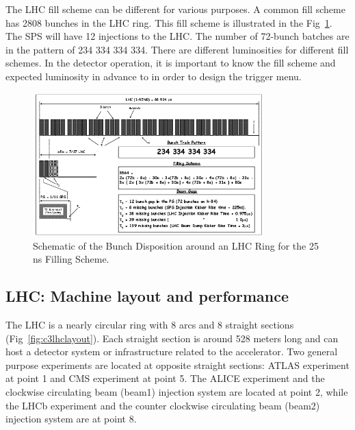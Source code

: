 The LHC fill scheme can be different for various purposes. A common fill scheme has 2808 bunches in the LHC ring. This fill scheme is illustrated in the Fig~\ref{fig:c3lhcfillscheme}. The SPS will have 12 injections to the LHC. The number of 72-bunch batches are in the pattern of 234 334 334 334. There are different luminosities for different fill schemes. In the detector operation, it is important to know the fill scheme and expected luminosity in advance to in order to design the trigger menu. 

\begin{figure}[htbp]
 \begin{center}
  \includegraphics[width=0.8\textwidth]{figures/c3/c3_lhc_fillscheme.png}
 \end{center}
 \caption{Schematic of the Bunch Disposition around an LHC Ring for the 25 ns Filling Scheme.}
 \label{fig:c3lhcfillscheme}
\end{figure}

\clearpage
\subsection{LHC: Machine layout and performance}

The LHC is a nearly circular ring with 8 arcs and 8 straight sections (Fig~\ref{fig:c3lhclayout}). Each straight section is around 528 meters long and can host a detector system or infrastructure related to the accelerator. Two general purpose experiments are located at opposite straight sections: ATLAS experiment at point 1 and CMS experiment at point 5. The ALICE experiment and the clockwise circulating beam (beam1) injection system are located at point 2, while the LHCb experiment and the counter clockwise circulating beam (beam2) injection system are at point 8. 


